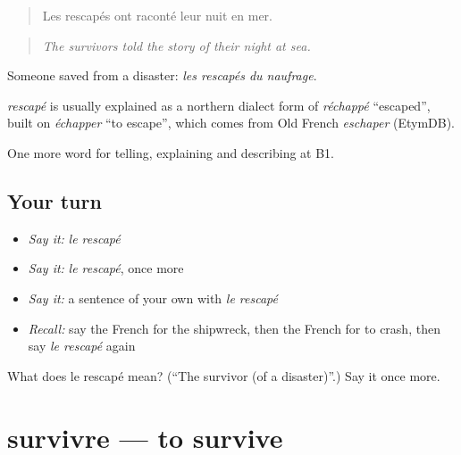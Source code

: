 \begin{quote}
Les rescapés ont raconté leur nuit en mer.
\end{quote}

\begin{quote}
\emph{The survivors told the story of their night at sea.}
\end{quote}

Someone saved from a disaster: \emph{les rescapés du naufrage}.

\begin{cousinweb}
\emph{rescapé} is usually explained as a northern dialect form of \emph{réchappé} \textquotedblleft{}escaped\textquotedblright{}, built on \emph{échapper} \textquotedblleft{}to escape\textquotedblright{}, which comes from Old French \emph{eschaper} (EtymDB).
\end{cousinweb}

\begin{grammarlens}[title={What you've built}]
One more word for telling, explaining and describing at B1.
\end{grammarlens}

\subsection*{Your turn}
\begin{itemize}
\raggedright
  \item \emph{Say it:} \emph{le rescapé}
  \item \emph{Say it:} \emph{le rescapé}, once more
  \item \emph{Say it:} a sentence of your own with \emph{le rescapé}
  \item \emph{Recall:} say the French for the shipwreck, then the French for to crash, then say \emph{le rescapé} again
\end{itemize}

\begin{tcolorbox}[breakable,colback=teal!4,colframe=teal!35!black,title={Before you move on}]
What does le rescapé mean? (\textquotedblleft{}The survivor (of a disaster)\textquotedblright{}.) Say it once more.
\end{tcolorbox}
\section[survivre]{survivre — to survive}

\label{lesson:FR-C305-survivre}



